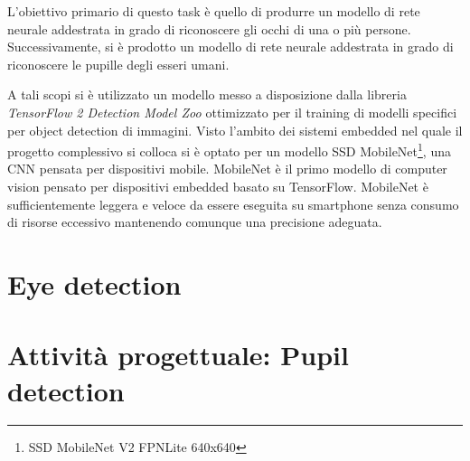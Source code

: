 L’obiettivo primario di questo task è quello di produrre un modello di rete neurale addestrata in grado di riconoscere gli occhi di una o più persone. Successivamente, si è prodotto un modello di rete neurale addestrata in grado di riconoscere le pupille degli esseri umani.

A tali scopi si è utilizzato un modello messo a disposizione dalla libreria \textit{TensorFlow 2 Detection Model Zoo \cite{tensorflow_repo}} ottimizzato per il training di modelli specifici per object detection di immagini. Visto l’ambito dei sistemi embedded nel quale il progetto complessivo si colloca si è optato per un modello SSD MobileNet\footnote{SSD MobileNet V2 FPNLite 640x640}\cite{mobilenet_repo}, una CNN pensata per dispositivi mobile. MobileNet è il primo modello di computer vision pensato per dispositivi embedded basato su TensorFlow. MobileNet è sufficientemente leggera e veloce da essere eseguita su smartphone senza consumo di risorse eccessivo mantenendo comunque una precisione adeguata.

\section{Eye detection}
\label{sec:eyedetection}


\section{Attività progettuale: Pupil detection}
\label{sec:gazedetection}

